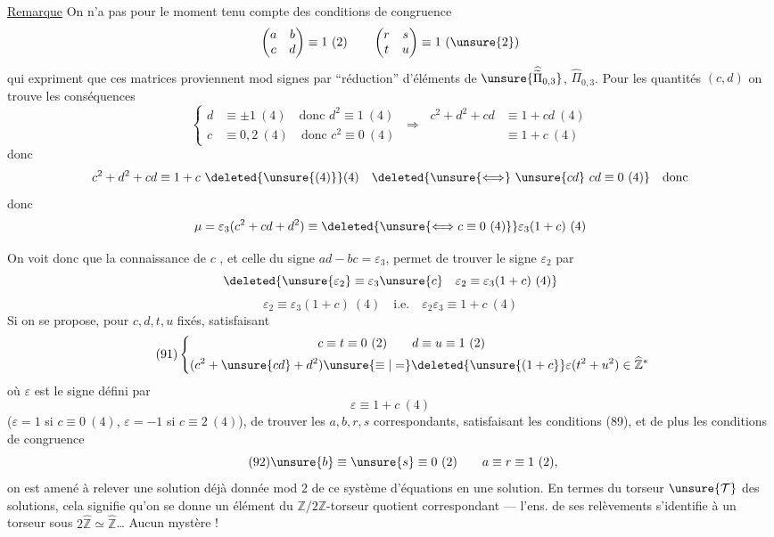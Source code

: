 \uline{Remarque} On n'a pas pour le moment tenu compte des conditions de
congruence
\[
\begin{pmatrix}a&b\\c&d\end{pmatrix}\equiv1\ (2)
\qquad
\begin{pmatrix}r&s\\t&u\end{pmatrix}\equiv1\ (\unsure{2})
\]
qui expriment que ces matrices proviennent mod signes par ``réduction''
d'éléments de
$\unsure{\widehat{\widetilde{\Pi}}_{0,3}}$, $\widehat{\Pi}_{0,3}$.
Pour les quantités $(c,d)$  on trouve les
conséquences
\[
\left\{\begin{aligned}
d&\equiv\pm1\ (4)\quad\text{donc }d^2\equiv1\ (4)\\
c&\equiv0,2\ (4)\quad\text{donc }c^2\equiv0\ (4)
\end{aligned}\right.
\ \Longrightarrow\
\begin{aligned}
c^2+d^2+cd&\equiv1+cd\ (4)\\
&\equiv1+c\ (4)
\end{aligned}
\]
donc
\[
c^2+d^2+cd\equiv1+c\ \deleted{\unsure{(4)}}(4)
\quad\deleted{\unsure{\Longleftrightarrow}\ \unsure{cd}\ cd\equiv0\ (4)}
\quad\text{donc}
\]
donc
\[
\mu=\varepsilon_3(c^2+cd+d^2)\equiv
\deleted{\unsure{\Longleftrightarrow c\equiv0\ (4)}}
\varepsilon_3(1+c)\ (4)
\]



On voit donc que la connaissance de $c$ 
, et celle du signe $ad-bc=\varepsilon_3$,
permet de trouver le signe $\varepsilon_2$  par
\[
\deleted{\unsure{\varepsilon_2}\equiv\varepsilon_3\unsure{c}\quad
\varepsilon_2\equiv\varepsilon_3(1+c)\ (4)}
\]
\[
\tag{90}
\varepsilon_2\equiv\varepsilon_3(1+c)\ (4)
\quad\text{i.e.}\quad
\varepsilon_2\varepsilon_3\equiv1+c\ (4)
\]
Si on se propose, pour $c,d,t,u$ fixés, satisfaisant
\[
\tag{91}
\left\{\begin{aligned}
c&\equiv t\equiv0\ (2)\qquad d\equiv u\equiv1\ (2)\\
(c^2+\unsure{cd}+d^2)&\unsure{\equiv|=}\deleted{\unsure{(1+c}}
\varepsilon(t^2+u^2)\in\widehat{\mathbb Z}^{*}
\end{aligned}\right.
\]
où $\varepsilon$ 
est le signe défini par
\[
\varepsilon\equiv1+c\ (4)
\]
($\varepsilon=1$ si $c\equiv0\ (4)$, $\varepsilon=-1$ si
$c\equiv2\ (4)$), de trouver les $a,b,r,s$ correspondants,
satisfaisant les conditions (89), et de plus les conditions de congruence
\[
\tag{92}
\unsure{b}\equiv\unsure{s}\equiv0\ (2)\qquad
a\equiv r\equiv1\ (2),
\]
on est amené à relever une solution déjà donnée mod $2$ de ce système
d'équations en une solution. En termes du 
torseur $\unsure{\mathcal T}$ des solutions, cela signifie qu'on se donne
un élément du $\mathbb Z/2\mathbb Z$-torseur quotient correspondant
--- l'ens. de ses relèvements s'identifie à un torseur sous
$2\widehat{\mathbb Z}\simeq\widehat{\mathbb Z}$\ldots{} Aucun mystère !

